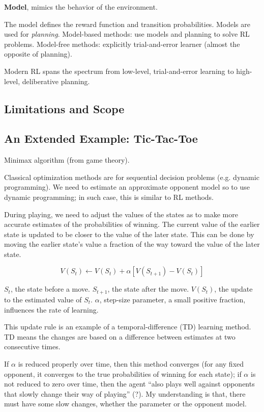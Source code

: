 \documentclass[sutton_barto_notes.tex]{subfiles}
\begin{document}
\begin{definition}
\textbf{Model}, mimics the behavior of the environment.
\end{definition}

The model defines the reward function and transition probabilities. Models are used for \textit{planning}.
Model-based methods: use models and planning to solve RL problems.
Model-free methods: explicitly trial-and-error learner (almost the opposite of planning).

Modern RL spans the spectrum from low-level, trial-and-error learning to high-level, deliberative planning.

\subsection{Limitations and Scope}
\subsection{An Extended Example: Tic-Tac-Toe}
Minimax algorithm \cite{wiki_minimax} (from game theory).

Classical optimization methods are for sequential decision problems (e.g. dynamic programming). We need to estimate an approximate opponent model so to use dynamic programming; in such case, this is similar to RL methods.

During playing, we need to adjust the values of the states as to make more accurate estimates of the probabilities of winning. The current value of the earlier state is updated to be closer to the value of the later state. This can be done by moving the earlier state's value a fraction of the way toward the value of the later state.

\begin{equation}
V(S_t) \leftarrow V(S_t) + \alpha[V(S_{t+1}) - V(S_t)]
\end{equation}

$S_t$, the state before a move.
$S_{t+1}$, the state after the move.
$V(S_t)$, the update to the estimated value of $S_t$.
$\alpha$, step-size parameter, a small positive fraction, influences the rate of learning.

This update rule is an example of a temporal-difference (TD) learning method. TD means the changes are based on a difference between estimates at two consecutive times.

If $\alpha$ is reduced properly over time, then this method converges (for any fixed opponent, it converges to the true probabilities of winning for each state); if $\alpha$ is not reduced to zero over time, then the agent ``also plays well against opponents that slowly change their way of playing'' (?). My understanding is that, there must have some slow changes, whether the parameter or the opponent model.
\end{document}
